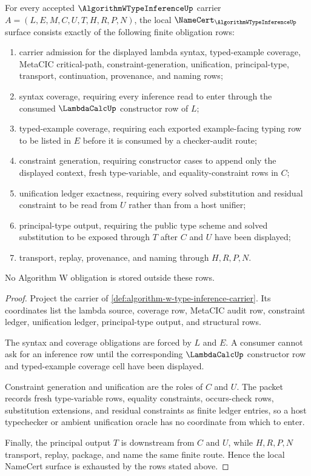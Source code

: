 \begin{theorem}
\label{thm:algorithm-w-type-inference-namecert-obligations}
For every accepted $\AlgorithmWTypeInferenceUp$ carrier $A=(L,E,M,C,U,T,H,R,P,N)$, the local $\NameCert_{\AlgorithmWTypeInferenceUp}$ surface consists exactly of the following finite obligation rows:
\begin{enumerate}
\item carrier admission for the displayed lambda syntax, typed-example coverage, MetaCIC critical-path, constraint-generation, unification, principal-type, transport, continuation, provenance, and naming rows;
\item syntax coverage, requiring every inference read to enter through the consumed $\LambdaCalcUp$ constructor row of $L$;
\item typed-example coverage, requiring each exported example-facing typing row to be listed in $E$ before it is consumed by a checker-audit route;
\item constraint generation, requiring constructor cases to append only the displayed context, fresh type-variable, and equality-constraint rows in $C$;
\item unification ledger exactness, requiring every solved substitution and residual constraint to be read from $U$ rather than from a host unifier;
\item principal-type output, requiring the public type scheme and solved substitution to be exposed through $T$ after $C$ and $U$ have been displayed;
\item transport, replay, provenance, and naming through $H,R,P,N$.
\end{enumerate}
No Algorithm W obligation is stored outside these rows.
\end{theorem}
\begin{proof}
Project the carrier of \autoref{def:algorithm-w-type-inference-carrier}. Its coordinates list the lambda source, coverage row, MetaCIC audit row, constraint ledger, unification ledger, principal-type output, and structural rows.

The syntax and coverage obligations are forced by $L$ and $E$. A consumer cannot ask for an inference row until the corresponding $\LambdaCalcUp$ constructor row and typed-example coverage cell have been displayed.

Constraint generation and unification are the roles of $C$ and $U$. The packet records fresh type-variable rows, equality constraints, occurs-check rows, substitution extensions, and residual constraints as finite ledger entries, so a host typechecker or ambient unification oracle has no coordinate from which to enter.

Finally, the principal output $T$ is downstream from $C$ and $U$, while $H,R,P,N$ transport, replay, package, and name the same finite route. Hence the local NameCert surface is exhausted by the rows stated above.
\end{proof}

